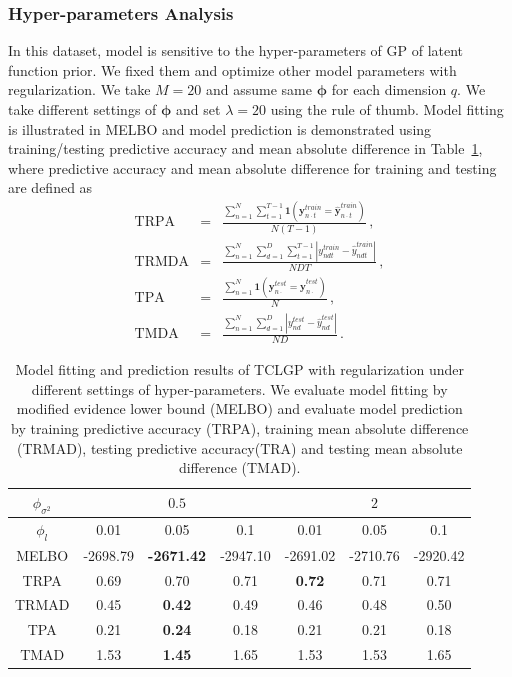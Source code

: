 \documentclass{article}
\begin{document}
\subsubsection{Hyper-parameters Analysis}
In this dataset, model is sensitive to the hyper-parameters of GP of latent function prior. We fixed them and optimize other model parameters with regularization. We take $M = 20$ and assume same $\bm \phi$ for each dimension $q$. We take different settings of $\bm \phi$ and set $\lambda =20$ using  the rule of thumb. Model fitting is illustrated in MELBO and model prediction is demonstrated using training/testing predictive accuracy and  mean absolute difference in Table~\ref{tab:STOCK}, where predictive accuracy and mean absolute difference for training and testing are defined as 
\begin{eqnarray}
\mathrm{TRPA} & = & \frac{\sum_{n = 1}^{N}\sum_{t = 1}^{T-1}\bm 1(\bm y^{train}_{n\cdot t} = \hat{\bm y}^{train}_{n\cdot t})}{N(T-1)} \,, \nonumber \\
\mathrm{TRMDA} & = & \frac{\sum_{n = 1}^{N}\sum_{d = 1}^{D}\sum_{t=1}^{T-1}|y^{train}_{ndt}-\hat{y}^{train}_{ndt}|}{NDT} \,, \nonumber \\
\mathrm{TPA} & = & \frac{\sum_{n = 1}^{N}\bm 1(\bm y^{test}_{n\cdot} = \hat{\bm y}^{test}_{n\cdot})}{N} \,, \nonumber \\
\mathrm{TMDA} & = & \frac{\sum_{n = 1}^{N}\sum_{d = 1}^{D}|y^{test}_{nd}-\hat{y}^{test}_{nd}|}{ND} \,. \nonumber
\end{eqnarray} 

\begin{table}[ht!]
	\centering
	\begin{tabular}{|c|c|c|c|c|c|c|}
		\hline
		$\phi_{\sigma^2}$ & \multicolumn{3}{|c|}{$0.5$} & \multicolumn{3}{|c|}{$2$} \\
		\hline
		$\phi_l$ & 0.01 & 0.05 & 0.1 & 0.01 & 0.05 & 0.1  \\
		\hline
		MELBO & -2698.79 & \textbf{-2671.42} & -2947.10 & -2691.02 & -2710.76 & -2920.42\\
		\hline
		TRPA & 0.69 & 0.70 & 0.71 & \textbf{0.72} & 0.71 & 0.71  \\
		\hline
		TRMAD & 0.45 & \textbf{0.42} & 0.49 & 0.46 & 0.48 & 0.50 \\
		\hline
		TPA  & 0.21 & \textbf{0.24} & 0.18 & 0.21 & 0.21 & 0.18 \\
		\hline
		TMAD & 1.53 & \textbf{1.45} & 1.65 & 1.53 & 1.53 & 1.65 \\
		\hline
	\end{tabular}
    \caption{Model fitting and prediction results of TCLGP with regularization under different settings of hyper-parameters. We evaluate model fitting by modified evidence lower bound (MELBO) and evaluate model prediction by training predictive accuracy (TRPA), training mean absolute difference (TRMAD), testing predictive accuracy(TRA) and testing mean absolute difference (TMAD).}
	\label{tab:STOCK}
\end{table}
\end{document}
